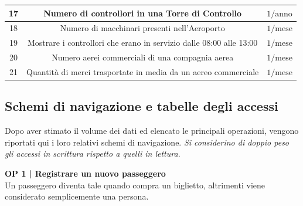 \begin{tabular}{ | c c c |}
	\hline
	\textsf{\small 17} & \textsf{\small Numero di controllori in una Torre di Controllo} & \textsf{\small $ 1 / \text{anno} $} \\
	\hline
	\textsf{\small 18} & \textsf{\small Numero di macchinari presenti nell'Aeroporto} & \textsf{\small $ 1 / \text{mese} $} \\
	\hline
	\textsf{\small 19} & \textsf{\small Mostrare i controllori che erano in servizio dalle 08:00 alle 13:00} & \textsf{\small $ 1 / \text{mese} $} \\
	\hline
	\textsf{\small 20} & \textsf{\small Numero aerei commerciali di una compagnia aerea} & \textsf{\small $ 1/ \text{mese} $} \\
	\hline
	\textsf{\small 21} & \textsf{\small Quantità di merci trasportate in media da un aereo commerciale} & \textsf{\small $ 1/ \text{mese} $} \\
	\hline
\end{tabular}


\newpage

\enlargethispage{1\linewidth}

\subsection{Schemi di navigazione e tabelle degli accessi}

\textsf{\small Dopo aver stimato il volume dei dati ed elencato le principali operazioni, vengono riportati qui i loro relativi schemi di navigazione. \emph{Si considerino di doppio peso gli accessi in scrittura rispetto a quelli in lettura}.}\break




\textbf{\small OP 1 | Registrare un nuovo passeggero}\\

\textsf{\small Un passeggero diventa tale quando compra un biglietto, altrimenti viene considerato semplicemente una persona.}\break


